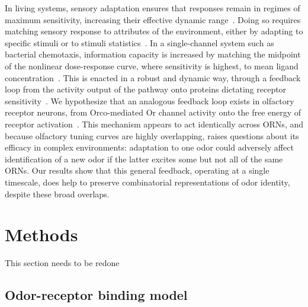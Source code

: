 \documentclass[9pt,twocolumn,twoside,lineno]{pnas-new}
\begin{document}
In living systems, sensory adaptation ensures that responses remain in regimes of maximum sensitivity, increasing their effective dynamic range~\cite{adaptation_fairhall, adaptation_nagel, laughlin, deweese_adaptation}. Doing so requires matching sensory response to attributes of the environment, either by adapting to specific stimuli or to stimuli statistics~\cite{adaptation_fairhall}. 
In a single-channel system such as bacterial chemotaxis, information capacity is increased by matching the midpoint of the nonlinear dose-response curve, where sensitivity is highest, to mean ligand concentration~\cite{information_theory_adaptation}. This is enacted in a robust and dynamic way, through a feedback loop from the activity output of the pathway onto proteins dictating receptor sensitivity~\cite{robustness_barkai, robustness_alon}. We hypothesize that an analogous feedback loop exists in olfactory receptor neurons, from Orco-mediated Or channel activity onto the free energy of receptor activation~\cite{srinivas_elife}. %
This mechanism appears to act identically across ORNs, and because olfactory tuning curves are highly overlapping, raises questions about its efficacy in complex environments: adaptation to one odor could adversely affect identification of a new odor if the latter excites some but not all of the same ORNs. Our results show that this general feedback, operating at a single timescale, does help to preserve combinatorial representations of odor identity, despite these broad overlaps. 







\section*{Methods}

\iffalse
{\color {blue} This section needs to be redone}
\subsection*{Odor-receptor binding model}
\end{document}
